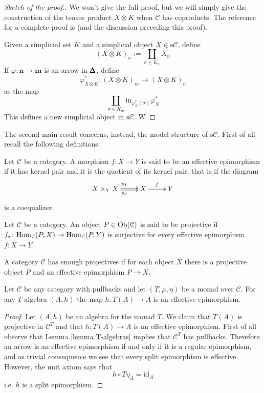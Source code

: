 \begin{refsection}
\begin{proof}[Sketch of the proof.]
We won't give the full proof, but we will simply give the construction of the tensor product $X \otimes K$ when $\mathcal C$ has coproducts. The reference for a complete proof is \cite[Prop. II.1.2]{quillen} (and the discussion preceding this proof).

Given a simplicial set $K$ and a simplicial object $X \in \mathrm s \mathcal C$, define
\[
(X \otimes K)_n := \coprod_{\sigma \in K_n} X_n
\]
If $\varphi \colon \mathbf n \to \mathbf m$ is an arrow in $\pmb{\Delta}$, define
\[
\varphi_{X \otimes K}^* \colon (X \otimes K)_m \to (X \otimes K)_n
\]
as the map
\[
\coprod_{\sigma \in K_m} \mathrm{in}_{\varphi_K^*(\sigma)} \varphi_X^*
\]
This defines a new simplicial object in $\mathrm s \mathcal C$. W
\end{proof}

The second main result concerns, instead, the model structure of $\mathrm s \mathcal C$. First of all recall the following definitions:

\begin{defin}
Let $\mathcal C$ be a category. A morphism $f \colon X \to Y$ is said to be an effective epimorphism if it has kernel pair and it is the quotient of its kernel pair, that is if the diagram
\[
\xymatrix{ X \times_Y X \ar@<.3ex>[r]^{p_1} \ar@<-.3ex>[r]_{p_2} & X \ar[r]^f & Y }
\]
is a coequalizer.
\end{defin}

\begin{defin} \label{def projective}
Let $\mathcal C$ be a category. An object $P \in \operatorname{Ob}(\mathcal C)$ is said to be projective if $f_* \colon \mathrm{Hom}_{\mathcal C}(P,X) \to \mathrm{Hom}_{\mathcal C}(P,Y)$ is surjective for every effective epimorphism $f \colon X \to Y$.
\end{defin}

\begin{defin}
A category $\mathcal C$ has enough projectives if for each object $X$ there is a projective object $P$ and an effective epimorphism $P \to X$.
\end{defin}

\begin{lemma}
Let $\mathcal C$ be any category with pullbacks and let $(T,\mu,\eta)$ be a monad over $\mathcal C$. For any $T$-algebra $(A,h)$ the map $h \colon T(A) \to A$ is an effective epimorphism.
\end{lemma}

\begin{proof}
Let $(A, h)$ be an algebra for the monad $T$. We claim that $T(A)$ is projective in $\mathcal C^T$ and that $h \colon T(A) \to A$ is an effective epimorphism. First of all observe that Lemma \ref{lemma T-algebras} implies that $\mathcal C^T$ has pullbacks. Therefore an arrow is an effective epimorphism if and only if it is a regular epimorphism, and as trivial consequence we see that every split epimorphism is effective. However, the unit axiom says that
\[
h \circ T \eta_A = \mathrm{id}_A
\]
i.e. $h$ is a split epimorphism.
\end{proof}


\end{refsection}
